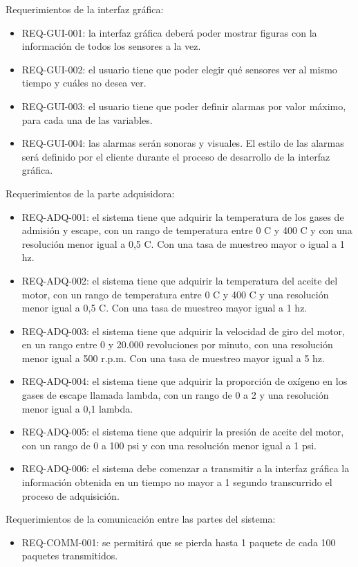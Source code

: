 \break
Requerimientos de la interfaz gráfica:
\begin{itemize}
\item REQ-GUI-001: la interfaz gráfica deberá poder mostrar figuras con la información de todos los sensores a la vez.
\item REQ-GUI-002: el usuario tiene que poder elegir qué sensores ver al mismo tiempo y cuáles no desea ver.
\item REQ-GUI-003: el usuario tiene que poder definir alarmas por valor máximo, para cada una de las variables.
\item REQ-GUI-004: las alarmas serán sonoras y visuales. El estilo de las alarmas será definido por el cliente durante el proceso de desarrollo de la interfaz gráfica.
\end{itemize}

Requerimientos de la parte adquisidora:
\begin{itemize}
\item REQ-ADQ-001: el sistema tiene que adquirir la temperatura de los gases de admisión y escape, con un rango de temperatura entre 0 \degree C y 400 \degree C y con una resolución menor igual a 0,5 \degree C. Con una tasa de muestreo mayor o igual a 1 hz.
\item REQ-ADQ-002: el sistema tiene que adquirir la temperatura del aceite del motor, con un rango de temperatura entre 0 \degree C y 400 \degree C y una resolución menor igual a 0,5 \degree C. Con una tasa de muestreo mayor igual a 1 hz.
\item REQ-ADQ-003: el sistema tiene que adquirir la velocidad de giro del motor, en un rango entre 0 y 20.000 revoluciones por minuto, con una resolución menor igual a 500 r.p.m. Con una tasa de muestreo mayor igual a 5 hz.
\item REQ-ADQ-004: el sistema tiene que adquirir la proporción de oxígeno en los gases de escape llamada lambda, con un rango de 0 a 2 y una resolución menor igual a 0,1 lambda.
\item REQ-ADQ-005: el sistema tiene que adquirir la presión de aceite del motor, con un rango de 0 a 100 psi y con una resolución menor igual a 1 psi.
\item REQ-ADQ-006: el sistema debe comenzar a transmitir a la interfaz gráfica la información obtenida en un tiempo no mayor a 1 segundo transcurrido el proceso de adquisición.
\end{itemize}

Requerimientos de la comunicación entre las partes del sistema:
\begin{itemize}
\item REQ-COMM-001: se permitirá que se pierda hasta 1 paquete de cada 100 paquetes transmitidos.
\end{itemize}